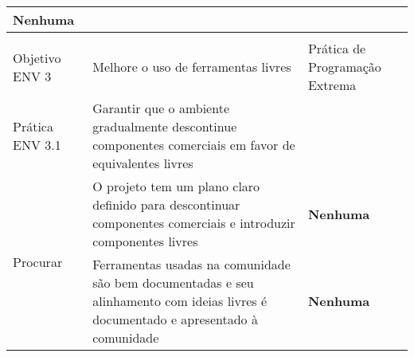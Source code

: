 \begin{longtable}{|p{2cm}|p{7cm}|p{7cm}|}
  \textbf{Nenhuma} \\
  \hline
  & & \\
  \hline \cellcolor[gray]{0.6} Objetivo ENV 3 & \cellcolor[gray]{0.6}
  Melhore o uso de ferramentas livres & Prática de Programação Extrema \\
  \hline \cellcolor[gray]{0.9} Prática ENV 3.1 & \cellcolor[gray]{0.9}
  Garantir que o ambiente gradualmente descontinue componentes
  comerciais em favor de equivalentes livres & \\
  \hline \multirow{2}{*}{Procurar} & O projeto tem um plano claro
  definido para descontinuar componentes comerciais e introduzir
  componentes livres &
  \textbf{Nenhuma} \\
  \cline{2-3} & Ferramentas usadas na comunidade são bem documentadas
  e seu alinhamento com ideias livres é documentado e apresentado à
  comunidade & \textbf{Nenhuma} \\
  \hline
\end{longtable}

